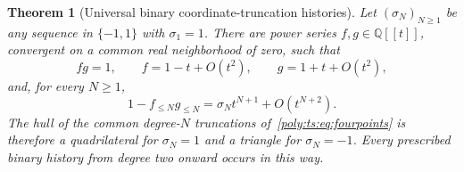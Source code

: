 \documentclass[11pt,a4paper]{article}
\numberwithin{equation}{section}
\newtheorem{theorem}{Theorem}[section]
\theoremstyle{plain}
\newcommand{\Q}{\mathbb Q}
\begin{document}
\begin{theorem}[Universal binary coordinate-truncation histories]\label{poly:ts:thm:universal}
Let $(\sigma_N)_{N\ge1}$ be any sequence in $\{-1,1\}$ with
$\sigma_1=1$. There are power series $f,g\in\Q[[t]]$, convergent on a
common real neighborhood of zero, such that
\begin{equation}\label{poly:ts:eq:fgconditions}
 fg=1,\qquad f=1-t+O(t^2),\qquad g=1+t+O(t^2),
\end{equation}
and, for every $N\ge1$,
\begin{equation}\label{poly:ts:eq:universal-defect}
 1-f_{\le N}g_{\le N}=\sigma_N t^{N+1}+O(t^{N+2}).
\end{equation}
The hull of the common degree-$N$ truncations of~\eqref{poly:ts:eq:fourpoints}
is therefore a quadrilateral for $\sigma_N=1$ and a triangle for
$\sigma_N=-1$. Every prescribed binary history from degree two onward
occurs in this way.
\end{theorem}
\end{document}
